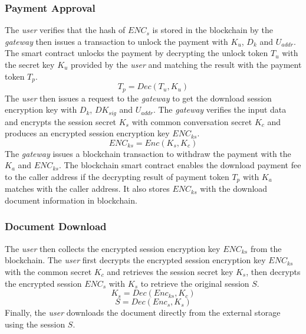 \subsubsection{Payment Approval}
The {\it user} verifies that the hash of $ENC_s$ is stored in the blockchain by the {\it gateway} then issues a transaction to unlock the payment with $K_u$, $D_k$ and $U_{addr}$. The smart contract unlocks the payment by decrypting the unlock token $T_u$ with the secret key $K_u$ provided by the {\it user} and matching the result with the payment token $T_p$. 
\begin{equation}
\label{eq-d-6} 
T_p = Dec (T_u, K_u)
\end{equation}
The {\it user} then issues a request to the {\it gateway} to get the download session encryption key with $D_k$, $DK_{sig}$ and $U_{addr}$. The {\it gateway} verifies the input data and encrypts the session secret $K_s$ with common conversation secret $K_c$ and produces an encrypted session encryption key $ENC_{ks}$.
\begin{equation}
\label{eq-d-7} 
ENC_{ks} = Enc (K_s, K_c)
\end{equation}
The {\it gateway} issues a blockchain transaction to withdraw the payment with the $K_a$ and $ENC_{ks}$. The blockchain smart contract enables the download payment fee to the caller address if the decrypting result of payment token $T_p$ with $K_a$ matches with the caller address. It also stores $ENC_{ks}$ with the download document information in blockchain.

\subsubsection{Document Download}
The {\it user} then collects the encrypted session encryption key $ENC_{ks}$ from the blockchain. The {\it user} first decrypts the encrypted session encryption key $ENC_{ks}$ with the common secret $K_c$ and retrieves the session secret key $K_s$, then decrypts the encrypted session $ENC_s$ with $K_s$ to retrieve the original session $S$.
\begin{equation}
\label{eq-d-8} 
K_s = Dec (Enc_{ks}, K_c)
\end{equation}
\begin{equation}
\label{eq-d-9} 
S = Dec (Enc_s, K_s)
\end{equation}
Finally, the {\it user} downloads the document directly from the external storage using the session $S$.

